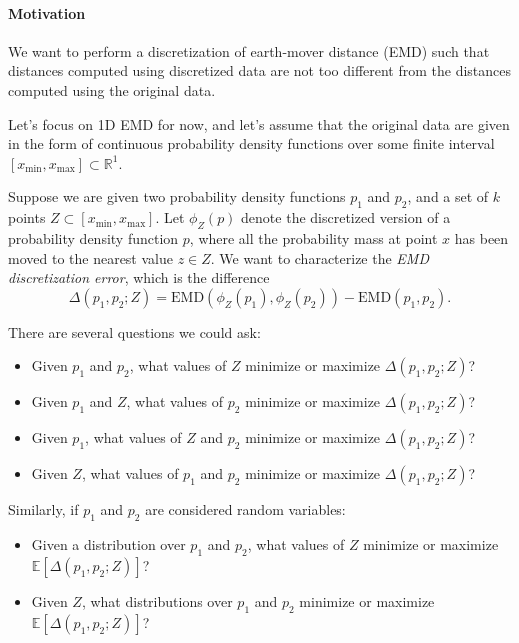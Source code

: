 \documentclass[11pt]{article}
\newcommand{\EMD}{\mathrm{EMD}}
\newcommand{\xmin}{x_\mathrm{min}}
\newcommand{\xmax}{x_\mathrm{max}}
\theoremstyle{definition}
\begin{document}
\paragraph{Motivation} We want to perform a discretization of earth-mover distance (EMD) such that distances computed using discretized data are not too different from the distances computed using the original data.

Let's focus on 1D EMD for now, and let's assume that the original data are given in the form of continuous probability density functions over some finite interval $[\xmin, \xmax] \subset \mathbb R^1$.

Suppose we are given two probability density functions $p_1$ and $p_2$, and a set of $k$ points $Z \subset [\xmin, \xmax]$.  Let $\phi_Z(p)$ denote the discretized version of a probability density function $p$, where all the probability mass at point $x$ has been moved to the nearest value $z \in Z$.  We want to characterize the \emph{EMD discretization error}, which is the difference
\[ \Delta(p_1, p_2; Z) = \EMD(\phi_Z(p_1), \phi_Z(p_2)) - \EMD(p_1, p_2). \]

\noindent There are several questions we could ask:
\begin{itemize}
\item Given $p_1$ and $p_2$, what values of $Z$ minimize or maximize $\Delta(p_1, p_2; Z)$?
\item Given $p_1$ and $Z$, what values of $p_2$ minimize or maximize $\Delta(p_1, p_2; Z)$?
\item Given $p_1$, what values of $Z$ and $p_2$ minimize or maximize $\Delta(p_1, p_2; Z)$?
\item Given $Z$, what values of $p_1$ and $p_2$ minimize or maximize $\Delta(p_1, p_2; Z)$?
\end{itemize}

\noindent Similarly, if $p_1$ and $p_2$ are considered random variables:
\begin{itemize}
\item Given a distribution over $p_1$ and $p_2$, what values of $Z$ minimize or maximize $\mathbb E[\Delta(p_1, p_2; Z)]$?
\item Given $Z$, what distributions over $p_1$ and $p_2$ minimize or maximize $\mathbb E[\Delta(p_1, p_2; Z)]$?
\end{itemize}
\end{document}
